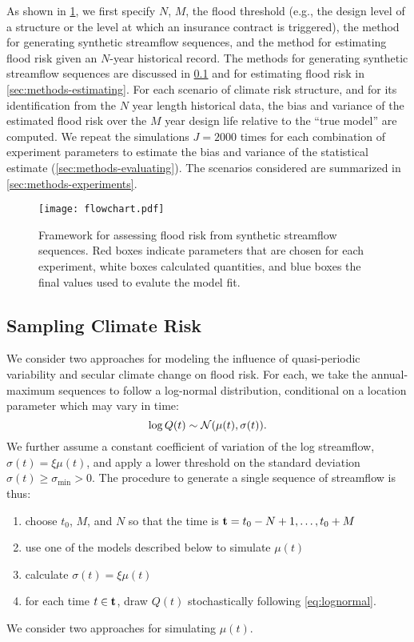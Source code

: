 \documentclass[
  draft,
  linenumbers
]{agujournal2018}
\makeatletter
\newcommand{\eg}{e.g.\@\xspace}
\newcommand{\normal}{\mathcal{N}}
\makeatother
\begin{document}
As shown in \cref{fig:methods-summary}, we first specify $N$, $M$, the flood threshold (\eg, the design level of a structure or the level at which an insurance contract is triggered), the method for generating synthetic streamflow sequences, and the method for estimating flood risk given an $N$-year historical record.
The methods for generating synthetic streamflow sequences are discussed in \cref{sec:methods-generating} and for estimating flood risk in \cref{sec:methods-estimating}.
For each scenario of climate risk structure, and for its identification from the $N$ year length historical data, the bias and variance of the estimated flood risk over the $M$ year design life relative to the ``true model'' are computed.
We repeat the simulations $J = 2000$ times for each combination of experiment parameters to estimate the bias and variance of the statistical estimate (\cref{sec:methods-evaluating}).
The scenarios considered are summarized in \cref{sec:methods-experiments}.
\begin{figure}
  \centering
  \texttt{[image: flowchart.pdf]}
  \caption{
    Framework for assessing flood risk from synthetic streamflow sequences.
    Red boxes indicate parameters that are chosen for each experiment, white boxes calculated quantities, and blue boxes the final values used to evalute the model fit.
  }\label{fig:methods-summary}
\end{figure}

\subsection{Sampling Climate Risk}\label{sec:methods-generating}

We consider two approaches for modeling the influence of quasi-periodic variability and secular climate change on flood risk.
For each, we take the annual-maximum sequences to follow a log-normal distribution, conditional on a location parameter which may vary in time:
\begin{equation} \label{eq:lognormal}
  \log Q(t) \sim \normal \qty(\mu(t), \sigma(t)).
\end{equation}
We further assume a constant coefficient of variation of the log streamflow, $\sigma(t) = \xi \mu(t)$, and apply a lower threshold on the standard deviation $\sigma(t) \geq \sigma_\text{min} > 0$.
The procedure to generate a single sequence of streamflow is thus:
\begin{enumerate}
  \item choose $t_0$, $M$, and $N$ so that the time is $\vb{t}=t_0-N+1, \ldots, t_0+M$
  \item use one of the models described below to simulate $\mu(t)$
  \item calculate $\sigma(t) = \xi \mu(t)$
  \item for each time $t \in \vb{t}$, draw $Q(t)$ stochastically following \cref{eq:lognormal}.
\end{enumerate}
We consider two approaches for simulating $\mu(t)$.
\end{document}
